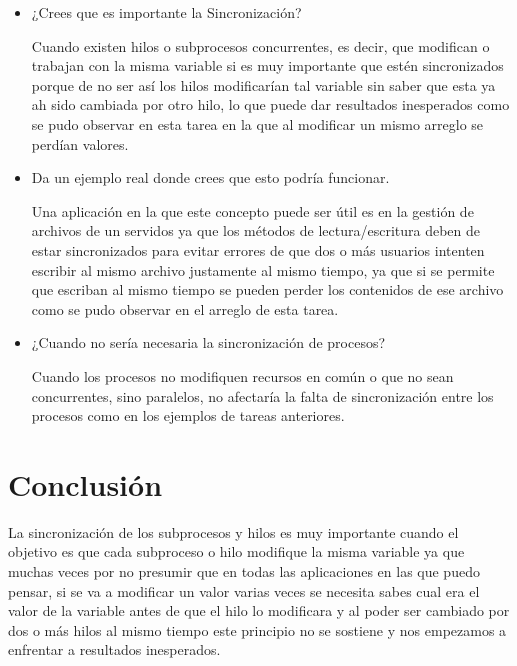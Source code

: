 \documentclass[12pt]{article}
\begin{document}
\begin{itemize}
\item ¿Crees que es importante la Sincronización?

  Cuando existen hilos o subprocesos concurrentes, es decir, que
  modifican o trabajan con la misma variable si es muy importante que
  estén sincronizados porque de no ser así los hilos modificarían tal
  variable sin saber que esta ya ah sido cambiada por otro hilo, lo
  que puede dar resultados inesperados como se pudo observar en esta
  tarea en la que al modificar un mismo arreglo se perdían valores.

\item Da un ejemplo real donde crees que esto podría funcionar.

  Una aplicación en la que este concepto puede ser útil es en la
  gestión de archivos de un servidos ya que los métodos de
  lectura/escritura deben de estar sincronizados para evitar errores
  de que dos o más usuarios intenten escribir al mismo archivo
  justamente al mismo tiempo, ya que si se permite que escriban al
  mismo tiempo se pueden perder los contenidos de ese archivo como se
  pudo observar en el arreglo de esta tarea.

\item ¿Cuando no sería necesaria la sincronización de procesos?

  Cuando los procesos no modifiquen recursos en común o que no sean
  concurrentes, sino paralelos, no afectaría la falta de
  sincronización entre los procesos como en los ejemplos de tareas
  anteriores.

\end{itemize}

\section*{Conclusión}

La sincronización de los subprocesos y hilos es muy importante cuando
el objetivo es que cada subproceso o hilo modifique la misma variable
ya que muchas veces por no presumir que en todas las aplicaciones en
las que puedo pensar, si se va a modificar un valor varias veces se
necesita sabes cual era el valor de la variable antes de que el hilo
lo modificara y al poder ser cambiado por dos o más hilos al mismo
tiempo este principio no se sostiene y nos empezamos a enfrentar a
resultados inesperados.
\end{document}
